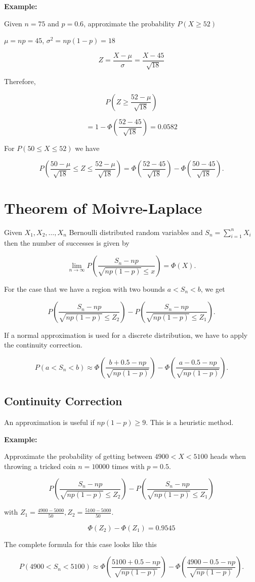 \textbf{Example:}

Given \(n = 75\) and \(p = 0.6\), approximate the probability \(P(X \ge 52)\)

\(\mu = np = 45\), \(\sigma^2 = np(1 - p) = 18\)

\[
    Z = \frac{X - \mu}{\sigma} = \frac{X - 45}{\sqrt{18}}
\]

Therefore,

\[
    P \left( Z \ge \frac{52 - \mu}{\sqrt{18}} \right)
\]

\[
    = 1 - \Phi \left( \frac{52 - 45}{\sqrt{18}} \right) = 0.0582
\]

For \(P( 50 \le X \le 52)\) we have 

\[
    P \left( \frac{50 - \mu}{\sqrt{18}} \le Z \le \frac{52 - \mu}{\sqrt{18}} \right) = \Phi \left( \frac{52 - 45}{\sqrt{18}} \right) - 
    \Phi \left( \frac{50 - 45}{\sqrt{18}} \right).
\]

\section{Theorem of Moivre-Laplace}

Given \(X_1, X_2, \dots, X_n\) Bernoulli distributed random variables and \(S_n = \sum_{i = 1}^{n} X_i\) then the 
number of successes is given by 

\[
    \lim_{n \to \infty} P \left( \frac{S_n - np}{\sqrt{np (1 - p)} \le x}\right) = \Phi(X).
\]

For the case that we have a region with two bounds \(a < S_n < b\), we get

\[
    P \left( \frac{S_n - np}{\sqrt{np (1 - p)} \le Z_2}\right) - P \left( \frac{S_n - np}{\sqrt{np (1 - p)} \le Z_1}\right).
\]

If a normal approximation is used for a discrete distribution, we have to apply the continuity correction.

\[
    P (a < S_n < b) \approx \Phi \left( \frac{b + 0.5 - np}{\sqrt{np(1 - p)}}\right) - 
    \Phi \left( \frac{a - 0.5 - np}{\sqrt{np(1 - p)}}\right).
\]

\subsection{Continuity Correction}

An approximation is useful if \(np(1 - p) \ge 9\). This is a heuristic method.

\textbf{Example:}

Approximate the probability of getting between \(4900 < X < 5100\) heads when throwing a tricked coin
\(n = 10000\) times with \(p = 0.5\).

\[
    P \left( \frac{S_n - np}{\sqrt{np (1 - p)} \le Z_2}\right) - P \left( \frac{S_n - np}{\sqrt{np (1 - p)} \le Z_1}\right)
\]

with \(Z_1 = \frac{4900 - 5000}{50}, Z_2 = \frac{5100 - 5000}{50}\).

\[
    \Phi(Z_2) - \Phi(Z_1) = 0.9545
\]

The complete formula for this case looks like this

\[
    P (4900 < S_n < 5100) \approx \Phi \left( \frac{5100 + 0.5 - np}{\sqrt{np(1 - p)}}\right) - 
    \Phi \left( \frac{4900 - 0.5 - np}{\sqrt{np(1 - p)}}\right).
\]